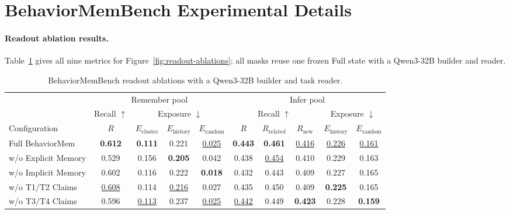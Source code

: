 \documentclass[sigconf,nonacm,balance=false]{acmart}
\makeatletter
\newcommand{\TableRowShade}[2]{\noalign{%
    \begingroup\color{#1}%
    \hrule width #2 height \dimexpr\ht\@arstrutbox+\dp\@arstrutbox\relax
    \kern-\dimexpr\ht\@arstrutbox+\dp\@arstrutbox\relax
    \endgroup}}
\makeatother
\begin{document}
\section{BehaviorMemBench Experimental Details}
\label{app:exp}
\label{app:exp-behaviormembench}

\paragraph{\textbf{Readout ablation results.}}
\label{app:bmb-readout-ablation}
Table~\ref{tab:ablation-main} gives all nine metrics for Figure~\ref{fig:readout-ablations}; all masks reuse one frozen Full state with a Qwen3-32B builder and reader.

\begin{table}[t]
    \centering
    \caption{BehaviorMemBench readout ablations with a Qwen3-32B builder and task reader.}
    \label{tab:ablation-main}
    \footnotesize
    \setlength{\tabcolsep}{2.4pt}
    \renewcommand{\arraystretch}{1.06}
    \begin{tabular*}{\textwidth}{@{\extracolsep{\fill}}lcccc@{\hspace{7pt}}ccccc@{}}
        \toprule
        & \multicolumn{4}{c}{\cellcolor{TableHeader}Remember pool} & \multicolumn{5}{c}{\cellcolor{TableHeader}Infer pool} \\
        \cmidrule(lr){2-5}\cmidrule(lr){6-10}
        & Recall $\uparrow$ & \multicolumn{3}{c}{Exposure $\downarrow$} & \multicolumn{3}{c}{Recall $\uparrow$} & \multicolumn{2}{c}{Exposure $\downarrow$} \\
        \cmidrule(lr){2-2}\cmidrule(lr){3-5}\cmidrule(lr){6-8}\cmidrule(lr){9-10}
        Configuration & $R$ & $E_{\mathrm{cluster}}$ & $E_{\mathrm{history}}$ & $E_{\mathrm{random}}$ & $R$ & $R_{\mathrm{related}}$ & $R_{\mathrm{new}}$ & $E_{\mathrm{history}}$ & $E_{\mathrm{random}}$ \\
        \midrule
        \TableRowShade{TableHighlight}{\textwidth}
        Full BehaviorMem & \textbf{0.612} & \textbf{0.111} & 0.221 & \underline{0.025} & \textbf{0.443} & \textbf{0.461} & \underline{0.416} & \underline{0.226} & \underline{0.161} \\
        w/o Explicit Memory & 0.529 & 0.156 & \textbf{0.205} & 0.042 & 0.438 & \underline{0.454} & 0.410 & 0.229 & 0.163 \\
        w/o Implicit Memory & 0.602 & 0.116 & 0.222 & \textbf{0.018} & 0.432 & 0.443 & 0.409 & 0.227 & 0.165 \\
        w/o T1/T2 Claims & \underline{0.608} & 0.114 & \underline{0.216} & 0.027 & 0.435 & 0.450 & 0.409 & \textbf{0.225} & 0.165 \\
        w/o T3/T4 Claims & 0.596 & \underline{0.113} & 0.237 & \underline{0.025} & \underline{0.442} & 0.449 & \textbf{0.423} & 0.228 & \textbf{0.159} \\
        \bottomrule
    \end{tabular*}
\end{table}
\end{document}
